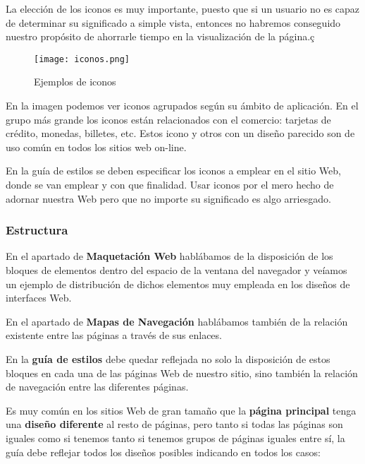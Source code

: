 La elección de los iconos es muy importante, puesto que si un usuario no es capaz de determinar su significado a simple vista, entonces no habremos conseguido nuestro propósito de ahorrarle tiempo en la visualización de la página.ç

\begin{figure}[H]
    \centering
    \texttt{[image: iconos.png]}
    \caption{Ejemplos de iconos}
\end{figure}

En la imagen podemos ver iconos agrupados según su ámbito de aplicación. En el grupo más grande los iconos están relacionados con el comercio: tarjetas de crédito, monedas, billetes, etc. Estos icono y otros con un diseño parecido son de uso común en todos los sitios web on-line.

En la guía de estilos se deben especificar los iconos a emplear en el sitio Web, donde se van emplear y con que finalidad. Usar iconos por el mero hecho de adornar nuestra Web pero que no importe su significado es algo arriesgado.

\subsubsection{Estructura}
En el apartado de \textbf{Maquetación Web} hablábamos de la disposición de los bloques de elementos dentro del espacio de la ventana del navegador y veíamos un ejemplo de distribución de dichos elementos muy empleada en los diseños de interfaces Web.

En el apartado de \textbf{Mapas de Navegación} hablábamos también de la relación existente entre las páginas a través de sus enlaces.

En la \textbf{guía de estilos} debe quedar reflejada no solo la disposición de estos bloques en cada una de las páginas Web de nuestro sitio, sino también la relación de navegación entre las diferentes páginas.

Es muy común en los sitios Web de gran tamaño que la \textbf{página principal} tenga una \textbf{diseño diferente} al resto de páginas, pero tanto si todas las páginas son iguales como si tenemos tanto si tenemos grupos de páginas iguales entre sí, la guía debe reflejar todos los diseños posibles indicando en todos los casos:

